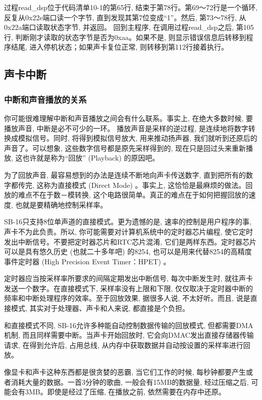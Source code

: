 \documentclass[12pt]{article}
\begin{document}
\begin{CJK}{UTF8}{gbsn}
过程read\_{}dsp位于代码清单10-1的第65行, 结束于第78行。第69～72行是一个循环, 反复从0x22e端口读一个字节, 直到发现其第7位变成“1”。然后, 第73～78行, 从0x22a端口读取状态字节, 并返回。
回到主程序, 在调用过程read\_{}dsp之后, 第105行, 判断刚才读取的状态字节是否为0xaa。如果不是, 则显示错误信息后转移到程序结尾, 进入停机状态；如果声卡复位正常, 则转移到第112行接着执行。

\subsection{声卡中断}
\subsubsection{中断和声音播放的关系}

你可能很难理解中断和声音播放之间会有什么联系。事实上, 在绝大多数时候, 要播放声音, 中断是必不可少的一环。
播放声音是采样的逆过程, 是连续地将数字转换成模拟信号。同时, 将得到模拟信号放大, 用来推动扬声器, 我们就听到还原后的声音了。可以想象, 这些数字信号都是原先采样得到的, 现在只是回过头来重新播放, 这也许就是称为“回放” (Playback) 的原因吧。

为了回放声音, 最容易想到的办法是连续不断地向声卡传送数字, 直到把所有的数字都传完, 这称为直接模式 (Direct Mode) 。事实上, 这恰恰是最麻烦的做法。回放的难点不在于数－模转换, 这个电路很简单。真正的难点在于如何把握回放的速度, 也就是要精确地控制采样率。

SB-16只支持8位单声道的直接模式。更为遗憾的是, 速率的控制是用户程序的事, 声卡不为此负责。所以, 你可能需要对计算机系统中的定时器芯片编程, 使它定时发出中断信号。不要把定时器芯片和RTC芯片混淆, 它们是两样东西。定时器芯片可以是具有悠久历史 (也就二十多年吧) 的8254, 也可以是用来代替8254的高精度事件定时器 (High Precision Event Timer：HPET) 。

定时器应当按采样率所要求的间隔定期发出中断信号, 每次中断发生时, 就往声卡发送一个数字。在直接模式下, 采样率没有上限和下限, 仅仅取决于定时器中断的频率和中断处理程序的效率。至于回放效果, 据很多人说, 不太好听。而且, 说是直接模式, 其实对于处理器、声卡和人来说, 都直接是个负担。

和直接模式不同, SB-16允许多种能自动控制数据传输的回放模式, 但都需要DMA机制, 而且同样需要中断。当声卡开始回放时, 它会向DMAC发出直接存储器传输请求, 在得到允许后, 占用总线, 从内存中获取数据并自动按设置的采样率进行回放。

像显卡和声卡这种东西都是很贪婪的恶霸, 当它们工作的时候, 每秒钟都要产生或者消耗大量的数据。一首3分钟的歌曲, 一般会有15MB的数据量, 经过压缩之后, 可能会有3MB。即使是经过了压缩, 在播放之前, 依然需要在内存中还原。


\end{CJK}
\end{document}
